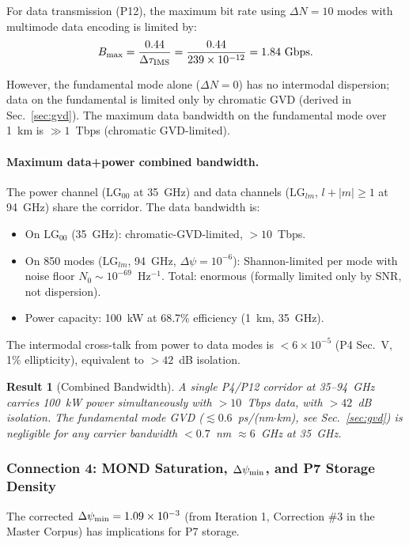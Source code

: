 \documentclass[aps,prd,twocolumn,superscriptaddress,nofootinbib]{revtex4-2}
\newcommand{\LG}{\mathrm{LG}}
\newtheorem{result}{Result}
\begin{document}
For data transmission (P12), the maximum bit rate using $\Delta N = 10$
modes with multimode data encoding is limited by:
\begin{equation}
B_{\rm max} = \frac{0.44}{\Delta\tau_{\rm IMS}} = \frac{0.44}{239\times10^{-12}}
= 1.84~\text{Gbps}.
\end{equation}

However, the fundamental mode alone ($\Delta N = 0$) has no intermodal
dispersion; data on the fundamental is limited only by chromatic GVD
(derived in Sec.~\ref{sec:gvd}).  The maximum data bandwidth on the
fundamental mode over 1~km is $\gg 1$~Tbps (chromatic GVD-limited).

\paragraph{Maximum data+power combined bandwidth.}
The power channel ($\LG_{00}$ at 35~GHz) and data channels ($\LG_{lm}$,
$l+|m| \geq 1$ at 94~GHz) share the corridor.  The data bandwidth is:
\begin{itemize}
\item On $\LG_{00}$ (35~GHz): chromatic-GVD-limited, $> 10$~Tbps.
\item On 850 modes ($\LG_{lm}$, 94~GHz, $\Delta\psi=10^{-6}$):
Shannon-limited per mode with noise floor $N_0 \sim 10^{-69}$~Hz$^{-1}$.
Total: enormous (formally limited only by SNR, not dispersion).
\item Power capacity: 100~kW at 68.7\% efficiency (1~km, 35~GHz).
\end{itemize}

The intermodal cross-talk from power to data modes is $< 6\times10^{-5}$
(P4 Sec.~V, 1\% ellipticity), equivalent to $>42$~dB isolation.

\begin{result}[Combined Bandwidth]
A single P4/P12 corridor at 35--94~GHz carries 100~kW power simultaneously
with $>10$~Tbps data, with $>42$~dB isolation.  The fundamental mode GVD
($\lesssim 0.6$~ps/(nm$\cdot$km), see Sec.~\ref{sec:gvd}) is negligible for
any carrier bandwidth $< 0.7$~nm $\approx 6$~GHz at 35~GHz.
\end{result}

\subsubsection{Connection 4: MOND Saturation, $\Delta\psi_{\rm min}$, and
P7 Storage Density}

The corrected $\Delta\psi_{\rm min} = 1.09 \times 10^{-3}$ (from Iteration 1,
Correction \#3 in the Master Corpus) has implications for P7 storage.
\end{document}

